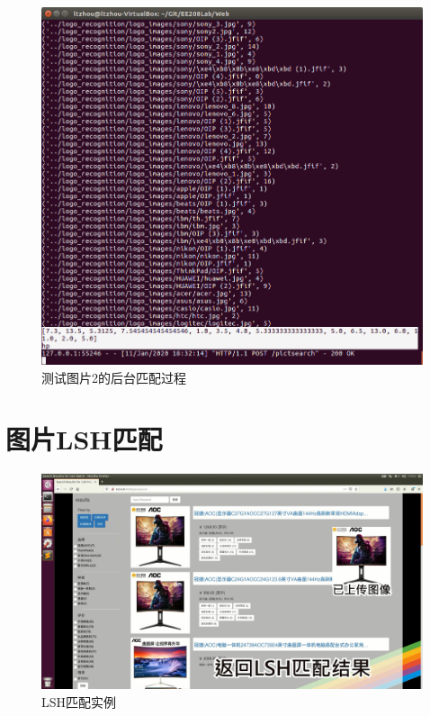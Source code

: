 \begin{figure}[htbp]
\centering
\includegraphics[width=14.5cm]{img/zlt/pictmatch2_2.png}
\caption{测试图片2的后台匹配过程}
\label{fig:zlt_pictmatch2_2}
\end{figure}

\section{图片LSH匹配}

\begin{figure}[htbp]
\centering
\includegraphics[width=14.5cm]{img/zlt/LSH.png}
\caption{LSH匹配实例}
\label{fig:zlt_LSH}
\end{figure}

